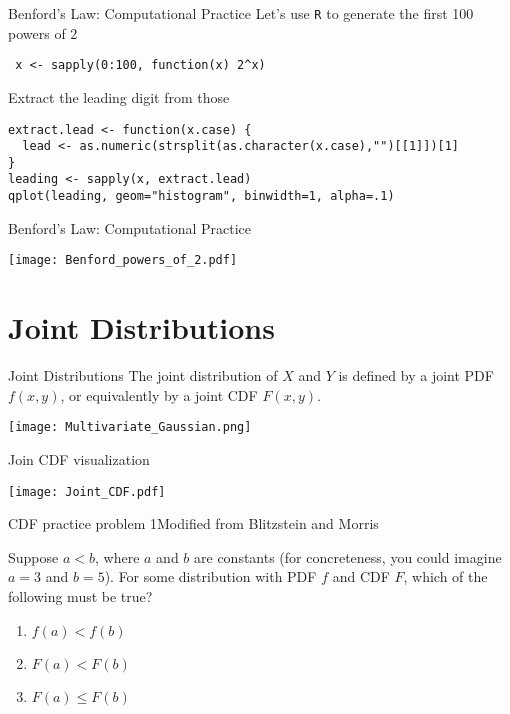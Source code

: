 \documentclass{beamer}
\begin{document}
\begin{frame}[fragile]{Benford's Law: Computational Practice}
Let's use \texttt{R} to generate the first 100 powers of 2
\pause
\begin{footnotesize}
\begin{verbatim} x <- sapply(0:100, function(x) 2^x) \end{verbatim}
\end{footnotesize}

Extract the leading digit from those
\pause
\begin{footnotesize}
\begin{verbatim}
extract.lead <- function(x.case) {
  lead <- as.numeric(strsplit(as.character(x.case),"")[[1]])[1]
}
leading <- sapply(x, extract.lead)
qplot(leading, geom="histogram", binwidth=1, alpha=.1)
\end{verbatim}
\end{footnotesize}
\end{frame}

\begin{frame}{Benford's Law: Computational Practice}
\begin{center}\texttt{[image: Benford\_powers\_of\_2.pdf]}\end{center}
\end{frame}

\section{Joint Distributions}
\begin{frame}{Joint Distributions}
The joint distribution of $X$ and $Y$ is defined by a \alert{joint PDF} $f(x,y)$, or equivalently by a \alert{joint CDF} $F(x,y)$.

\begin{center}\texttt{[image: Multivariate\_Gaussian.png]}\end{center}
\end{frame}

\begin{frame}{Join CDF visualization}
\begin{center}
\texttt{[image: Joint\_CDF.pdf]}
\end{center}
\end{frame}

\begin{frame}{CDF practice problem 1}{Modified from Blitzstein and Morris}

Suppose $a<b$, where $a$ and $b$ are constants (for concreteness, you could imagine $a=3$ and $b=5$). For some distribution with PDF $f$ and CDF $F$, which of the following must be true?
\begin{enumerate}
\item $f(a)<f(b)$
\item $F(a)<F(b)$
\item $F(a)\leq F(b)$
\end{enumerate}
\end{frame}
\end{document}
